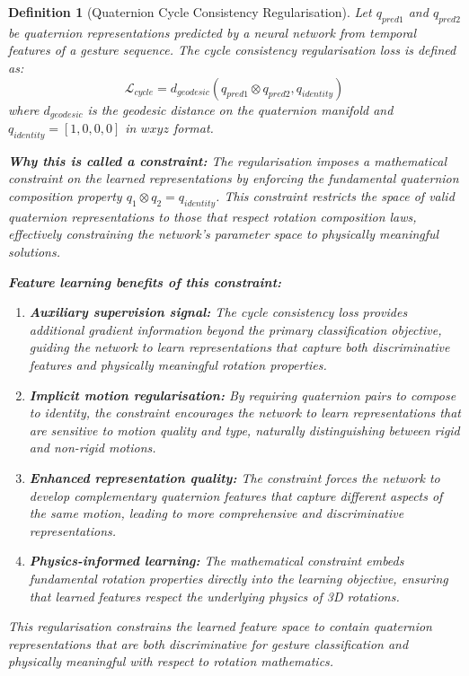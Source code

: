 \documentclass[journal]{IEEEtran}
\theoremstyle{plain}
\newtheorem{definition}{Definition}
\begin{document}
\begin{definition}[Quaternion Cycle Consistency Regularisation]\label{def:2}
Let $q_{pred1}$ and $q_{pred2}$ be quaternion representations predicted by a neural network from temporal features of a gesture sequence. The cycle consistency regularisation loss is defined as:
\begin{equation}
\mathcal{L}_{cycle} = d_{geodesic}(q_{pred1} \otimes q_{pred2}, q_{identity})
\end{equation}
where $d_{geodesic}$ is the geodesic distance on the quaternion manifold and $q_{identity} = [1, 0, 0, 0]$ in $wxyz$ format.


\textbf{Why this is called a constraint:} The regularisation imposes a mathematical constraint on the learned representations by enforcing the fundamental quaternion composition property $q_1 \otimes q_2 = q_{identity}$. This constraint restricts the space of valid quaternion representations to those that respect rotation composition laws, effectively constraining the network's parameter space to physically meaningful solutions.

\textbf{Feature learning benefits of this constraint:}
\begin{enumerate}
    \item \textbf{Auxiliary supervision signal:} The cycle consistency loss provides additional gradient information beyond the primary classification objective, guiding the network to learn representations that capture both discriminative features and physically meaningful rotation properties.
    \item \textbf{Implicit motion regularisation:} By requiring quaternion pairs to compose to identity, the constraint encourages the network to learn representations that are sensitive to motion quality and type, naturally distinguishing between rigid and non-rigid motions.
    \item \textbf{Enhanced representation quality:} The constraint forces the network to develop complementary quaternion features that capture different aspects of the same motion, leading to more comprehensive and discriminative representations.
    \item \textbf{Physics-informed learning:} The mathematical constraint embeds fundamental rotation properties directly into the learning objective, ensuring that learned features respect the underlying physics of 3D rotations.
\end{enumerate}

This regularisation constrains the learned feature space to contain quaternion representations that are both discriminative for gesture classification and physically meaningful with respect to rotation mathematics.
\end{definition}
\end{document}
